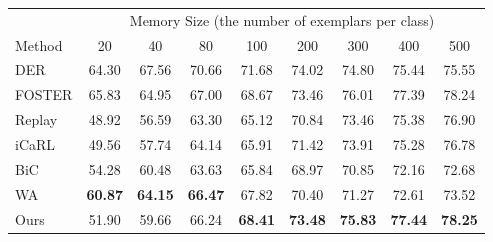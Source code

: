 \centering
\begin{tabular}{l|cccccccc}
\toprule
\multicolumn{1}{l|}{} & \multicolumn{8}{c}{Memory Size (the number of exemplars per class)} \\
\cmidrule(l){2-9}
Method & 20 & 40 & 80& 100 & 200 & 300 & 400 & 500 \\
\midrule
DER    & 64.30 & 67.56 & 70.66 & 71.68 & 74.02 & 74.80 &  75.44 & 75.55 \\
FOSTER & 65.83 & 64.95 & 67.00 & 68.67 & 73.46 & 76.01 & 77.39  &  78.24\\
\midrule
Replay & 48.92 & 56.59 & 63.30 & 65.12& 70.84 & 73.46 & 75.38  &  76.90 \\
iCaRL  & 49.56&  57.74 & 64.14 & 65.91 & 71.42 & 73.91 &  75.28 &  76.78\\
BiC    & 54.28 & 60.48 & 63.63 & 65.84 & 68.97 & 70.85 & 72.16  & 72.68 \\
WA     & \bf{60.87} & \bf{64.15} & \bf{66.47} & 67.82 & 70.40 & 71.27 &  72.61 &  73.52\\

\midrule
Ours   & 51.90 & 59.66 & 66.24 & \bf{68.41} & \bf{73.48} & \bf{75.83} & \bf{77.44}  & \bf{78.25} \\
\bottomrule
\end{tabular}
